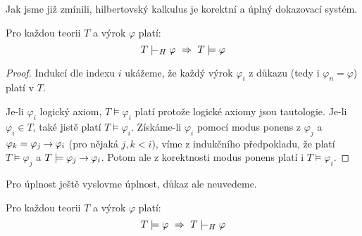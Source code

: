 Jak jsme již zmínili, hilbertovský kalkulus je korektní a úplný dokazovací systém.

\begin{theorem}
Pro každou teorii $T$ a výrok $\varphi$ platí:
$$
T\proves_H \varphi\ \Rightarrow\ T\models\varphi
$$
\end{theorem}
\begin{proof}
Indukcí dle indexu $i$ ukážeme, že každý výrok $\varphi_i$ z důkazu (tedy i $\varphi_n=\varphi$) platí v $T$.

Je-li $\varphi_i$ logický axiom, $T \models \varphi_i$ platí protože logické axiomy jsou tautologie. Je-li $\varphi_i\in T$, také jistě platí $T \models \varphi_i$. Získáme-li $\varphi_i$ pomocí modus ponens z $\varphi_j$ a $\varphi_k=\varphi_j\mathbin{\rightarrow}\varphi_i$ (pro nějaká $j,k<i$), víme z indukčního předpokladu, že platí $T \models \varphi_j$ a $T \models \varphi_j\mathbin{\rightarrow}\varphi_i$. Potom ale z korektnosti modus ponens platí i $T \models \varphi_i$.
\end{proof}

Pro úplnost ještě vyslovme úplnost, důkaz ale neuvedeme.

\begin{theorem}
Pro každou teorii $T$ a výrok $\varphi$ platí:
$$
T\models\varphi\ \Rightarrow\ T\proves_H\varphi
$$
\end{theorem}





